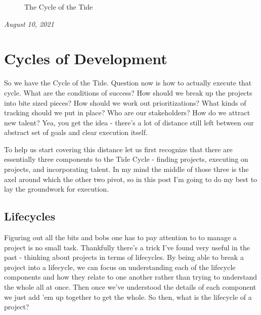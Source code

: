 \documentclass[10pt,a5paper]{book}
\begin{document}
\begin{figure}[!htb]
\caption{\label{fig:my-label} The Cycle of the Tide}
\end{figure}

\textit{August 10, 2021}

\section{Cycles of Development}
So we have the Cycle of the Tide. Question now is how to actually execute that cycle. What are the conditions of success? How should we break up the projects into bite sized pieces? How should we work out prioritizations? What kinds of tracking should we put in place? Who are our stakeholders? How do we attract new talent? Yea, you get the idea - there's a lot of distance still left between our abstract set of goals and clear execution itself. 

To help us start covering this distance let us first recognize that there are essentially three components to the Tide Cycle - finding projects, executing on projects, and incorporating talent. In my mind the middle of those three is the axel around which the other two pivot, so in this post I'm going to do my best to lay the groundwork for execution. 

\subsection{Lifecycles}
Figuring out all the bits and bobs one has to pay attention to to manage a project is no small task. Thankfully there's a trick I've found very useful in the past - thinking about projects in terms of lifecycles. By being able to break a project into a lifecycle, we can focus on understanding each of the lifecycle components and how they relate to one another rather than trying to understand the whole all at once. Then once we've understood the details of each component we just add 'em up together to get the whole. So then, what is the lifecycle of a project?
\end{document}
